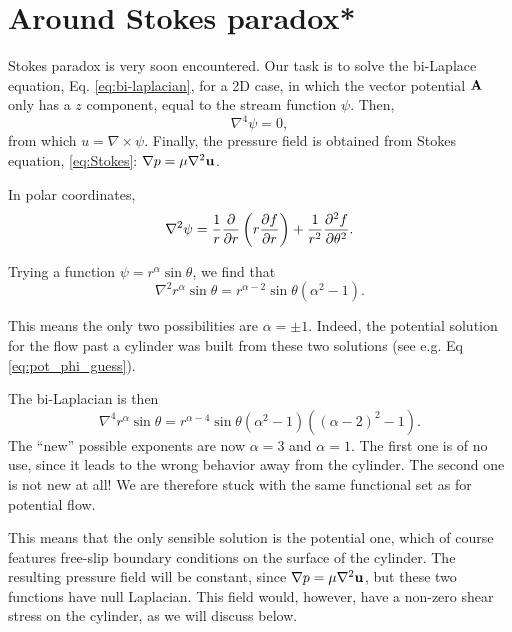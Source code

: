 \section{Around Stokes paradox*}
\label{sec:creeping_cylinder}

Stokes paradox is very soon encountered. Our task is to solve the
bi-Laplace equation, Eq. \ref{eq:bi-laplacian}, for a 2D case, in
which the vector potential $\mathbf{A}$ only has a $z$ component, equal
to the stream function $\psi$. Then,
\[
  \nabla^4 \psi = 0 ,
\]
from which $u=\nabla\times\psi$. Finally, the pressure field is
obtained from Stokes equation, \ref{eq:Stokes}:
$\nabla p = \mu \nabla^2 \mathbf{u}$.

In polar coordinates,
\begin{equation}
  \label{eq:Lapl_in_polar}
  \nabla^2 \psi =
  {1 \over  r}{\partial \over \partial  r}\left(
    r {\partial f \over \partial  r}\right)
  + {1 \over  r^2}{\partial^2 f \over \partial \theta^2} .
\end{equation}

Trying a function $\psi = r^\alpha \sin\theta$, we find that
\begin{equation*}
  \nabla^2   r^\alpha \sin\theta  =
  r^{\alpha-2} \sin\theta \left( \alpha^2 -1  \right) .
\end{equation*}

This means the only two possibilities are $\alpha=\pm 1$. Indeed, the
potential solution for the flow past a cylinder was built from these
two solutions (see e.g. Eq \ref{eq:pot_phi_guess}).

The bi-Laplacian is then
\begin{equation*}
  \nabla^4   r^\alpha \sin\theta  =
  r^{\alpha-4} \sin\theta
  \left( \alpha^2 -1  \right)
  \left( (\alpha-2)^2 -1  \right) .
\end{equation*}
The ``new'' possible exponents are now $\alpha=3$ and $\alpha=1$. The
first one is of no use, since it leads to the wrong behavior away from
the cylinder. The second one is not new at all! We are therefore stuck
with the same functional set as for potential flow.

This means that the only sensible solution is the potential one, which
of course features free-slip boundary conditions on the surface of the
cylinder. The resulting pressure field will be constant, since
$\nabla p = \mu \nabla^2 \mathbf{u}$, but these two functions have null
Laplacian. This field would, however, have a non-zero shear stress on
the cylinder, as we will discuss below.

